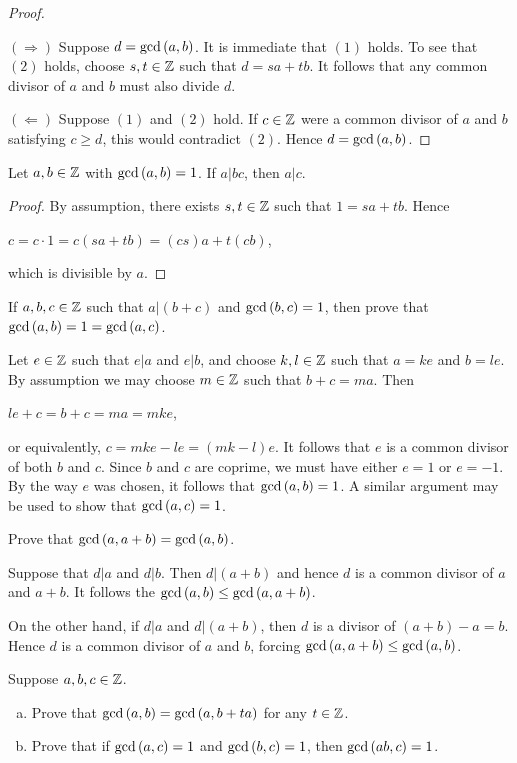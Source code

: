 \documentclass[11pt,fleqn,dvipsnames,usenames]{article}
\newcommand{\p}{\noindent}
\begin{document}
\begin{proof}~

$(\Rightarrow)$ Suppose $d = \text{gcd}\left(a, b\right)$.  It is immediate that $(1)$ holds.  To see that $(2)$ holds, choose $s,t\in\mathbb{Z}$ such that $d = sa + tb$.  It follows that any common divisor of $a$ and $b$ must also divide $d$.
\vsp

\p $(\Leftarrow)$ Suppose $(1)$ and $(2)$ hold.  If $c\in\mathbb{Z}$ were a common divisor of $a$ and $b$ satisfying $c\geq d$, this would contradict $(2)$.  Hence $d = \text{gcd}\left(a, b\right)$.
\end{proof}
%
\begin{corollary}
Let $a,b\in\mathbb{Z}$ with $\text{gcd}\left(a,b\right) = 1$.  If $a|bc$, then $a|c$.
\end{corollary}
%
\begin{proof}
By assumption, there exists $s,t\in\mathbb{Z}$ such that $1 = sa + tb$.  Hence
\begin{center}
$c = c\cdot 1 = c(sa + tb) = (cs)a + t(cb)$,
\end{center}
which is divisible by $a$.
\end{proof}
%
\begin{example}
If $a,b,c\in\mathbb{Z}$ such that $a|(b+c)$ and $\text{gcd}\left(b,c\right) = 1$, then prove that $\text{gcd}\left(a,b\right) = 1 = \text{gcd}\left(a,c\right)$.
\end{example}
%
\begin{solution}
Let $e\in\mathbb{Z}$ such that $e|a$ and $e|b$, and choose $k,l\in\mathbb{Z}$ such that $a = ke$ and $b = le$.  By assumption we may choose $m\in\mathbb{Z}$ such that $b+c = ma$.  Then
\begin{center}
$le + c = b + c = ma = mke$,
\end{center}
or equivalently, $c = mke - le = (mk - l)e$.  It follows that $e$ is a common divisor of both $b$ and $c$.  Since $b$ and $c$ are coprime, we must have either $e =1$ or $e = -1$.  By the way $e$ was chosen, it follows that $\text{gcd}\left(a, b\right) = 1$.  A similar argument may be used to show that $\text{gcd}\left(a, c\right) = 1$.
\end{solution}
%
\begin{example}
Prove that $\text{gcd}\left(a, a+b\right) = \text{gcd}\left(a,b\right)$.
\end{example}
%
\begin{solution}
\p Suppose that $d|a$ and $d|b$.  Then $d|(a+b)$ and hence $d$ is a common divisor of $a$ and $a+b$.  It follows the $\text{gcd}\left(a,b\right)\leq \text{gcd}\left(a, a+b\right)$.
\vsp

\p On the other hand, if $d|a$ and $d|(a+b)$, then $d$ is a divisor of $(a+b) - a = b$.  Hence $d$ is a common divisor of $a$ and $b$, forcing $\text{gcd}\left(a, a+b\right)\leq \text{gcd}\left(a, b\right)$.
\end{solution}
%
\begin{exercise}
Suppose $a,b,c\in\mathbb{Z}$.
\begin{enumerate}[(a)]
\item Prove that $\text{gcd}\left(a, b\right) = \text{gcd}\left(a, b + ta\right)$ for any $t\in\mathbb{Z}$.
\item Prove that if $\text{gcd}\left(a,c\right) = 1$ and $\text{gcd}\left(b,c\right) = 1$, then $\text{gcd}\left(ab, c\right) = 1$.
\end{enumerate}
\end{exercise}
\end{document}
